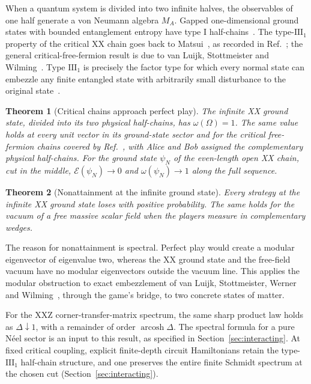 \documentclass[10pt,a4paper]{article}
\newtheorem{theorem}{Theorem}
\theoremstyle{remark}
\newcommand{\cE}{\mathcal{E}}
\newcommand{\IIIone}{\mathrm{III}_1}
\begin{document}
When a quantum system is divided into two infinite halves, the observables
of one half generate a von Neumann algebra $M_A$. Gapped one-dimensional
ground states with bounded entanglement entropy have type I
half-chains~\cite{Hastings07,Matsui13}. The type-$\IIIone$ property of the
critical XX chain goes back to Matsui~\cite{Matsui01}, as recorded in
Ref.~\cite[Proposition~6.9]{KMSW}; the general critical-free-fermion
result is due to van Luijk, Stottmeister and Wilming~\cite{vLSW25}.
Type $\IIIone$ is precisely the factor type for which every normal state can
embezzle any finite entangled state with arbitrarily small disturbance
to the original state~\cite{vLSWW24}.

\begin{theorem}[Critical chains approach perfect play]\label{thm:value}
The infinite XX ground state, divided into its two physical half-chains, has
$\omega(\Omega)=1$. The same value holds at every unit vector in its ground-state
sector and for the critical free-fermion chains covered by Ref.~\cite{vLSW25},
with Alice and Bob assigned the complementary physical half-chains.
For the ground state $\psi_N$ of the even-length open XX chain, cut in the middle,
$\cE(\psi_N)\to0$ and $\omega(\psi_N)\to1$ along the full sequence.
\end{theorem}

\begin{theorem}[Nonattainment at the infinite ground state]\label{thm:notattained}
Every strategy at the infinite XX ground state loses with positive probability.
The same holds for the vacuum of a free massive scalar field when the players
measure in complementary wedges.
\end{theorem}

The reason for nonattainment is spectral. Perfect play would create a modular
eigenvector of eigenvalue two, whereas the XX ground state and the free-field
vacuum have no modular eigenvectors outside the vacuum line. This applies the
modular obstruction to exact embezzlement of
van Luijk, Stottmeister, Werner and Wilming~\cite[Proposition~35 and
Corollary~36]{vLSWW24}, through the game's bridge, to two concrete
states of matter.

For the XXZ corner-transfer-matrix spectrum, the same sharp product law
holds as $\Delta\downarrow1$, with a remainder of order
$\operatorname{arcosh}\Delta$. The spectral formula for a pure
N\'eel sector is an input to this result, as specified in
Section~\ref{sec:interacting}. At fixed critical coupling, explicit finite-depth circuit
Hamiltonians retain the type-$\IIIone$ half-chain structure, and one
preserves the entire finite Schmidt spectrum at the chosen cut
(Section~\ref{sec:interacting}).
\end{document}
